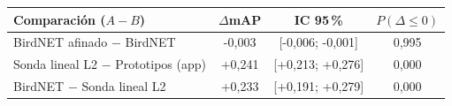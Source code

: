 \begin{tabular}{lccc}
\toprule
Comparación ($A - B$) & $\Delta$mAP & IC 95\,\% & $P(\Delta\leq 0)$\\
\midrule
BirdNET afinado $-$ BirdNET & -0{,}003 & [-0{,}006; -0{,}001] & 0{,}995\\
Sonda lineal L2 $-$ Prototipos (app) & +0{,}241 & [+0{,}213; +0{,}276] & 0{,}000\\
BirdNET $-$ Sonda lineal L2 & +0{,}233 & [+0{,}191; +0{,}279] & 0{,}000\\
\bottomrule
\end{tabular}
